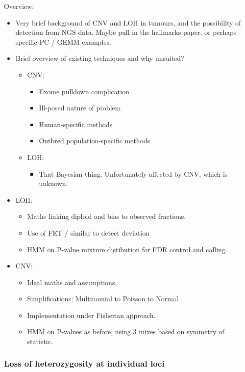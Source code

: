 \documentclass[thesis.tex]{subfiles}
\begin{document}
Overview:
\begin{itemize}
  \item Very brief background of CNV and LOH in tumours, and the possibility of detection from NGS data.  Maybe pull in the hallmarks paper, or perhaps specific PC / GEMM examples.
  \item Brief overview of existing techniques and why unsuited?
  \begin{itemize}
    \item CNV:
    \begin{itemize}
      \item Exome pulldown complication
      \item Ill-posed nature of problem
      \item Human-specific methods
      \item Outbred population-specific methods
    \end{itemize}
    \item LOH:
    \begin{itemize}
      \item That Bayesian thing.  Unfortunately affected by CNV, which is unknown.
    \end{itemize}
  \end{itemize}
  \item LOH:
  \begin{itemize}
    \item Maths linking diploid and bias to observed fractions.
    \item Use of FET / similar to detect deviation
    \item HMM on P-value mixture distibution for FDR control and calling.
  \end{itemize}
  \item CNV:
  \begin{itemize}
    \item Ideal maths and assumptions.
    \item Simplifications: Multinomial to Poisson to Normal
    \item Implementation under Fisherian approach.
    \item HMM on P-values as before, using 3 mixes based on symmetry of statistic.
  \end{itemize}
\end{itemize}


\subsubsection{Loss of heterozygosity at individual loci}
\end{document}
